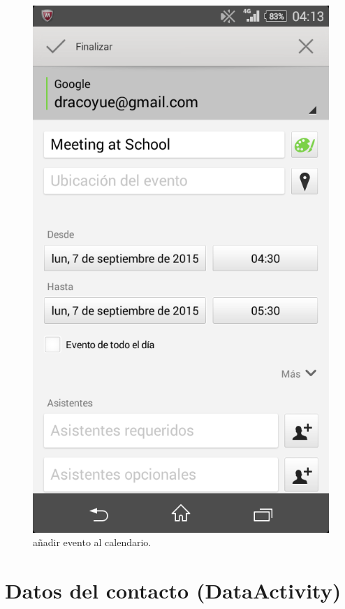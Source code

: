 			\begin{figure}[h !]
				\centering
				\includegraphics[scale=0.2]{Imagenes/App/addEvent}
				\caption{añadir evento al calendario.}
				\label{fig:addEvent}
			\end{figure}
	
	\section{Datos del contacto (DataActivity)} \label{sec:data}
	
